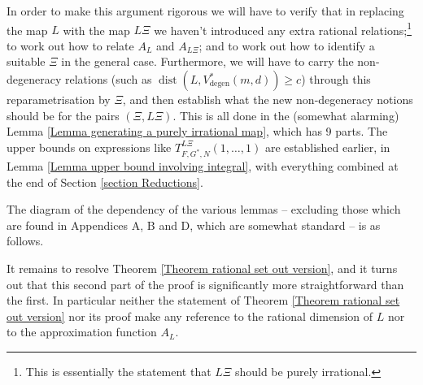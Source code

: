\documentclass[12pt,a4paper,twoside,reqno]{amsart}
\newcommand{\degen}{\operatorname{degen}}
\newcommand{\dist}{\operatorname{dist}}
\numberwithin{equation}{section}
\begin{document}
In order to make this argument rigorous we will have to verify that in replacing the map $L$ with the map $L\Xi$ we haven't introduced any extra rational relations;\footnote{This is essentially the statement that $L\Xi$ should be purely irrational.} to work out how to relate $A_{L}$ and $A_{L\Xi}$; and to work out how to identify a suitable $\Xi$ in the general case. Furthermore, we will have to carry the non-degeneracy relations (such as $\dist(L,V_{\degen}^*(m,d)) \geqslant c$) through this reparametrisation by $\Xi$, and then establish what the new non-degeneracy notions should be for the pairs $(\Xi,L\Xi)$. This is all done in the (somewhat alarming) Lemma \ref{Lemma generating a purely irrational map}, which has 9 parts. The upper bounds on expressions like $T_{F,G^*,N}^{L\Xi}(1,\dots,1)$ are established earlier, in Lemma \ref{Lemma upper bound involving integral}, with everything combined at the end of Section \ref{section Reductions}. 

 The diagram of the dependency of the various lemmas -- excluding those which are found in Appendices A, B and D, which are somewhat standard -- is as follows. \\


  \begin{center}
   \end{center}

\vspace{5mm}

It remains to resolve Theorem \ref{Theorem rational set out version}, and it turns out that this second part of the proof is significantly more straightforward than the first. In particular neither the statement of Theorem \ref{Theorem rational set out version} nor its proof make any reference to the rational dimension of $L$ nor to the approximation function $A_L$.
\end{document}
